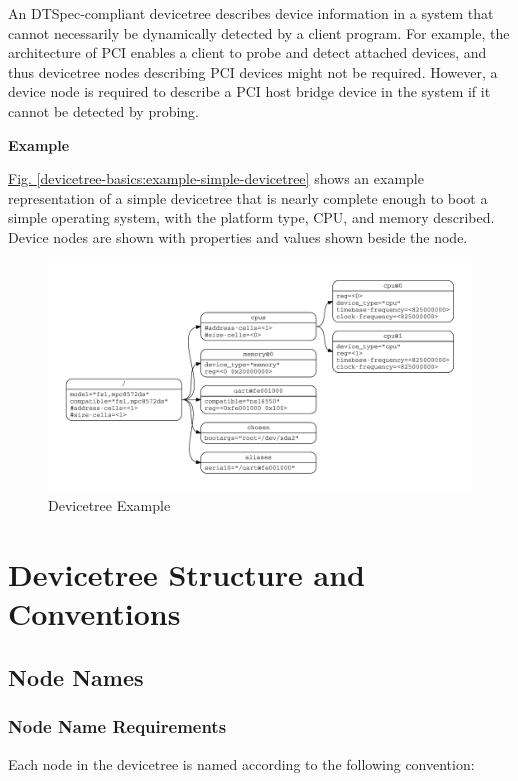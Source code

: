 \documentclass[a4paper,10pt,oneside]{sphinxmanual}
\begin{document}
An DTSpec-compliant devicetree describes device information in a system
that cannot necessarily be dynamically detected by a client program. For
example, the architecture of PCI enables a client to probe and detect
attached devices, and thus devicetree nodes describing PCI devices
might not be required. However, a device node is required to describe a
PCI host bridge device in the system if it cannot be detected by
probing.

\textbf{Example}

\hyperref[devicetree-basics:example-simple-devicetree]{Fig. \ref{devicetree-basics:example-simple-devicetree}} shows an example representation of a
simple devicetree that is nearly
complete enough to boot a simple operating system, with the platform
type, CPU, and memory described. Device nodes are shown with properties
and values shown beside the node.
\begin{figure}[htbp]
\centering
\capstart

\includegraphics{graphviz-e69f9031183bd8d3b6636722c922fcb66d4843c4.pdf}
\caption{Devicetree Example}\label{devicetree-basics:example-simple-devicetree}\label{devicetree-basics:id3}\end{figure}


\section{Devicetree Structure and Conventions}
\label{devicetree-basics:devicetree-structure-and-conventions}

\subsection{Node Names}
\label{devicetree-basics:node-names}\label{devicetree-basics:sect-node-names}

\subsubsection{Node Name Requirements}
\label{devicetree-basics:node-name-requirements}
Each node in the devicetree is named according to the following
convention:
\begin{quote}

\end{quote}
\end{document}
